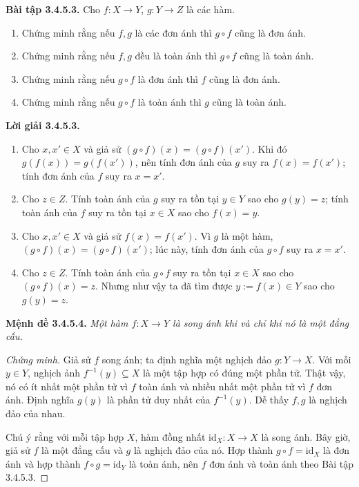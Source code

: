 \noindent\textbf{Bài tập 3.4.5.3.} Cho $f:X\to Y$, $g:Y\to Z$ là các hàm.
\begin{enumerate}[label=\alph*.]
\item Chứng minh rằng nếu $f,g$ là các đơn ánh thì $g\circ f$ cũng là đơn ánh.
\item Chứng minh rằng nếu $f,g$ đều là toàn ánh thì $g\circ f$ cũng là toàn ánh.
\item Chứng minh rằng nếu $g\circ f$ là đơn ánh thì $f$ cũng là đơn ánh.
\item Chứng minh rằng nếu $g\circ f$ là toàn ánh thì $g$ cũng là toàn ánh.
\end{enumerate}
\noindent\textbf{Lời giải 3.4.5.3.}\keepwithnext
\begin{enumerate}[label=\alph*.]
\item Cho $x,x'\in X$ và giả sử $(g\circ f)(x)=(g\circ f)(x')$. Khi đó $g(f(x))=g(f(x'))$, nên tính đơn ánh của $g$ suy ra $f(x)=f(x')$; tính đơn ánh của $f$ suy ra $x=x'$.
\item Cho $z\in Z$. Tính toàn ánh của $g$ suy ra tồn tại $y\in Y$ sao cho $g(y)=z$; tính toàn ánh của $f$ suy ra tồn tại $x\in X$ sao cho $f(x)=y$.
\item Cho $x,x'\in X$ và giả sử $f(x)=f(x')$. Vì $g$ là một hàm, $(g\circ f)(x)=(g\circ f)(x')$; lúc này, tính đơn ánh của $g\circ f$ suy ra $x=x'$.
\item Cho $z\in Z$. Tính toàn ánh của $g\circ f$ suy ra tồn tại $x\in X$ sao cho $(g\circ f)(x)=z$. Nhưng như vậy ta đã tìm được $y:=f(x)\in Y$ sao cho $g(y)=z$.
\end{enumerate}

\noindent\textbf{Mệnh đề 3.4.5.4.} \emph{Một hàm $f:X\to Y$ là song ánh khi và chỉ khi nó là một đẳng cấu.}
\begin{proof}[Chứng minh]
Giả sử $f$ song ánh; ta định nghĩa một nghịch đảo $g:Y\to X$. Với mỗi $y\in Y$, nghịch ảnh $f^{-1}(y)\subseteq X$ là một tập hợp có đúng một phần tử. Thật vậy, nó có ít nhất một phần tử vì $f$ toàn ánh và nhiều nhất một phần tử vì $f$ đơn ánh. Định nghĩa $g(y)$ là phần tử duy nhất của $f^{-1}(y)$. Dễ thấy $f,g$ là nghịch đảo của nhau.

Chú ý rằng với mỗi tập hợp $X$, hàm đồng nhất $\mathrm{id}_X:X\to X$ là song ánh. Bây giờ, giả sử $f$ là một đẳng cấu và $g$ là nghịch đảo của nó. Hợp thành $g\circ f=\mathrm{id}_X$ là đơn ánh và hợp thành $f\circ g=\mathrm{id}_Y$ là toàn ánh, nên $f$ đơn ánh và toàn ánh theo Bài tập 3.4.5.3.
\end{proof}

